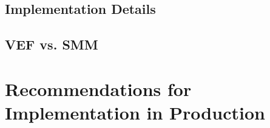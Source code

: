 \documentclass[../doc.tex]{subfiles}
\begin{document}
\subsection{Implementation Details}

\subsection{VEF vs. SMM}

\section{Recommendations for Implementation in Production}
\end{document}
